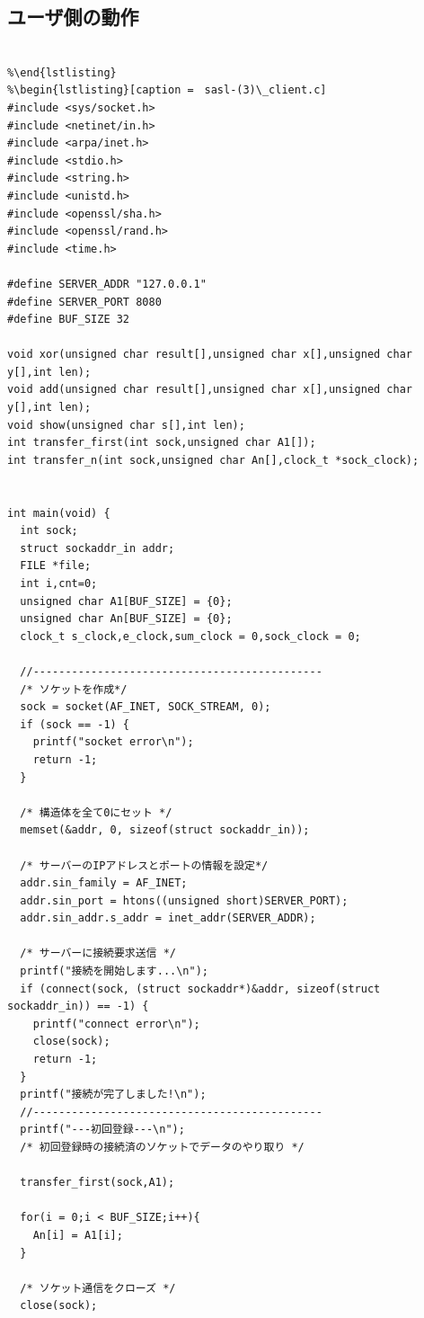 \documentclass{thesis}
\begin{document}
\subsection{ユーザ側の動作}
\fontsize{6.5pt}{5pt}
\begin{verbatim}

%\end{lstlisting}
%\begin{lstlisting}[caption =　sasl-(3)\_client.c]
#include <sys/socket.h>
#include <netinet/in.h>
#include <arpa/inet.h>
#include <stdio.h>
#include <string.h>
#include <unistd.h>
#include <openssl/sha.h>
#include <openssl/rand.h>
#include <time.h>

#define SERVER_ADDR "127.0.0.1"
#define SERVER_PORT 8080
#define BUF_SIZE 32

void xor(unsigned char result[],unsigned char x[],unsigned char y[],int len);
void add(unsigned char result[],unsigned char x[],unsigned char y[],int len);
void show(unsigned char s[],int len);
int transfer_first(int sock,unsigned char A1[]);
int transfer_n(int sock,unsigned char An[],clock_t *sock_clock);


int main(void) {
  int sock;
  struct sockaddr_in addr;
  FILE *file;
  int i,cnt=0;
  unsigned char A1[BUF_SIZE] = {0};
  unsigned char An[BUF_SIZE] = {0};
  clock_t s_clock,e_clock,sum_clock = 0,sock_clock = 0;
  
  //---------------------------------------------
  /* ソケットを作成*/
  sock = socket(AF_INET, SOCK_STREAM, 0);
  if (sock == -1) {
    printf("socket error\n");
    return -1;
  }
  
  /* 構造体を全て0にセット */
  memset(&addr, 0, sizeof(struct sockaddr_in));
  
  /* サーバーのIPアドレスとポートの情報を設定*/
  addr.sin_family = AF_INET;
  addr.sin_port = htons((unsigned short)SERVER_PORT);
  addr.sin_addr.s_addr = inet_addr(SERVER_ADDR);
  
  /* サーバーに接続要求送信 */
  printf("接続を開始します...\n");
  if (connect(sock, (struct sockaddr*)&addr, sizeof(struct sockaddr_in)) == -1) {
    printf("connect error\n");
    close(sock);
    return -1;
  }
  printf("接続が完了しました!\n");
  //---------------------------------------------
  printf("---初回登録---\n");
  /* 初回登録時の接続済のソケットでデータのやり取り */

  transfer_first(sock,A1);

  for(i = 0;i < BUF_SIZE;i++){
    An[i] = A1[i];
  }

  /* ソケット通信をクローズ */
  close(sock);
  

\end{verbatim}
\end{document}
